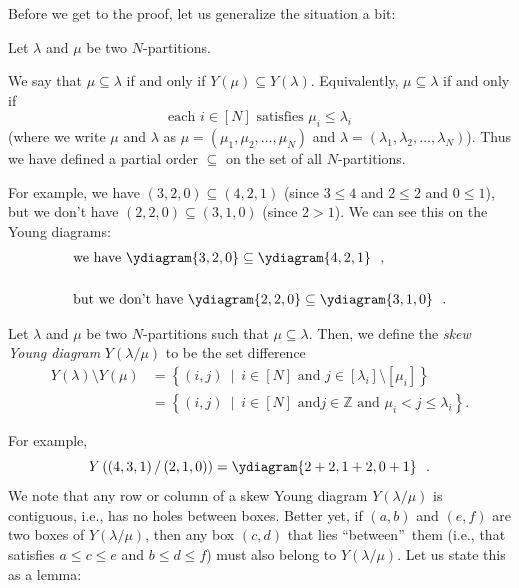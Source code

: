 Before we get to the proof, let us generalize the situation a bit:

\begin{definition}
\label{def.sf.par-subset}Let $\lambda$ and $\mu$ be two $N$-partitions.

We say that $\mu\subseteq\lambda$ if and only if $Y\left(  \mu\right)
\subseteq Y\left(  \lambda\right)  $. Equivalently, $\mu\subseteq\lambda$ if
and only if%
\[
\text{each }i\in\left[  N\right]  \text{ satisfies }\mu_{i}\leq\lambda_{i}%
\]
(where we write $\mu$ and $\lambda$ as $\mu=\left(  \mu_{1},\mu_{2},\ldots
,\mu_{N}\right)  $ and $\lambda=\left(  \lambda_{1},\lambda_{2},\ldots
,\lambda_{N}\right)  $). Thus we have defined a partial order $\subseteq$ on
the set of all $N$-partitions.
\end{definition}

For example, we have $\left(  3,2,0\right)  \subseteq\left(  4,2,1\right)  $
(since $3\leq4$ and $2\leq2$ and $0\leq1$), but we don't have $\left(
2,2,0\right)  \subseteq\left(  3,1,0\right)  $ (since $2>1$). We can see this
on the Young diagrams:%
\begin{align*}
&  \text{we have }\ydiagram{3,2,0} \subseteq\ydiagram{4,2,1}\text{\ \ ,}\\
& \\
&  \text{but we don't have }\ydiagram{2,2,0} \subseteq
\ydiagram{3,1,0}\text{\ \ .}%
\end{align*}


\begin{definition}
\label{def.sf.skew-diag}Let $\lambda$ and $\mu$ be two $N$-partitions such
that $\mu\subseteq\lambda$. Then, we define the \emph{skew Young diagram}
$Y\left(  \lambda/\mu\right)  $ to be the set difference%
\begin{align*}
Y\left(  \lambda\right)  \setminus Y\left(  \mu\right)   &  =\left\{  \left(
i,j\right)  \ \mid\ i\in\left[  N\right]  \text{ and }j\in\left[  \lambda
_{i}\right]  \setminus\left[  \mu_{i}\right]  \right\} \\
&  =\left\{  \left(  i,j\right)  \ \mid\ i\in\left[  N\right]  \text{ and
}j\in\mathbb{Z}\text{ and }\mu_{i}<j\leq\lambda_{i}\right\}  .
\end{align*}

\end{definition}

For example,%
\[
Y\left(  \left(  4,3,1\right)  /\left(  2,1,0\right)  \right)
=\ydiagram{2+2,1+2,0+1}\ \ .
\]
We note that any row or column of a skew Young diagram $Y\left(  \lambda
/\mu\right)  $ is contiguous, i.e., has no holes between boxes. Better yet, if
$\left(  a,b\right)  $ and $\left(  e,f\right)  $ are two boxes of $Y\left(
\lambda/\mu\right)  $, then any box $\left(  c,d\right)  $ that lies
\textquotedblleft between\textquotedblright\ them (i.e., that satisfies $a\leq
c\leq e$ and $b\leq d\leq f$) must also belong to $Y\left(  \lambda
/\mu\right)  $. Let us state this as a lemma:

